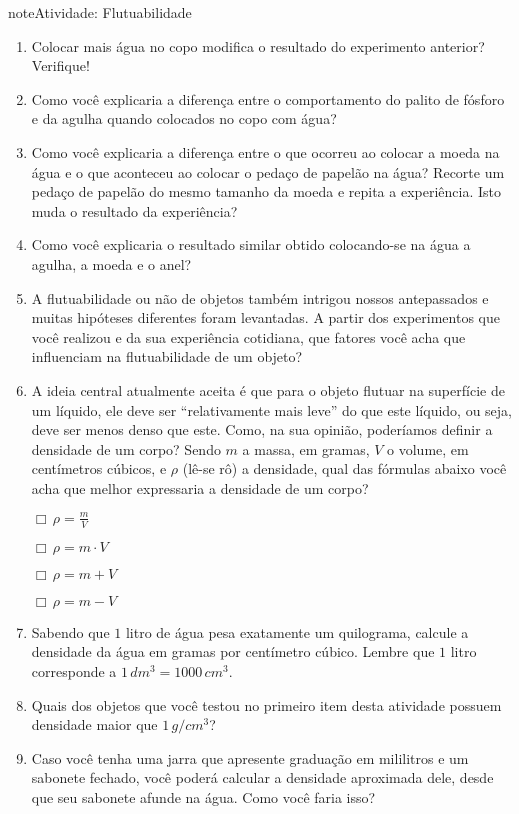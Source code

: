 \begin{sphinxadmonition}{note}{Atividade: Flutuabilidade}
\begin{enumerate}
\item {} 
Colocar mais água no copo modifica o resultado do experimento anterior? Verifique!

\item {} 
Como você explicaria a diferença entre o comportamento do palito de fósforo e da agulha quando colocados no copo com água?

\item {} 
Como você explicaria a diferença entre o que ocorreu ao colocar a moeda na água e o que aconteceu ao colocar o pedaço de papelão na água?  Recorte um pedaço de papelão do mesmo tamanho da moeda e repita a experiência. Isto muda o resultado da experiência?

\item {} 
Como você explicaria o resultado similar obtido colocando-se na água a agulha, a moeda e o anel?

\item {} 
A flutuabilidade ou não de objetos também intrigou nossos antepassados e muitas hipóteses diferentes foram levantadas. A partir dos experimentos que você realizou e da sua experiência cotidiana,  que fatores você acha que influenciam na flutuabilidade de um objeto?

\item {} 
A ideia central atualmente aceita é que para o objeto flutuar na superfície de um líquido, ele deve ser “relativamente mais leve” do que este líquido, ou seja, deve ser menos denso que este. Como, na sua opinião, poderíamos definir a densidade de um corpo? Sendo \(m\) a massa, em gramas, \(V\) o volume, em centímetros cúbicos, e  \(\rho\)  (lê-se rô) a densidade, qual das fórmulas abaixo você acha que melhor expressaria a densidade de um corpo?

\(\Box \, \rho = \frac{m}{V}\)

\(\Box \, \rho = m \cdot V\)

\(\Box \, \rho = m + V\)

\(\Box \, \rho = m - V\)

\item {} 
Sabendo que \(1\) litro de água pesa exatamente um quilograma, calcule a densidade da água em gramas por centímetro cúbico.  Lembre que \(1\) litro corresponde a \(1\,dm^3=1000\,cm^3\).

\item {} 
Quais dos objetos que você testou no primeiro item desta atividade possuem densidade maior que \(1 \,g/cm^3\)?

\item {} 
Caso você tenha uma jarra que apresente graduação em mililitros e um sabonete fechado, você poderá calcular a densidade aproximada dele, desde que seu sabonete afunde na água.  Como você faria isso?


\end{enumerate}
\end{sphinxadmonition}
